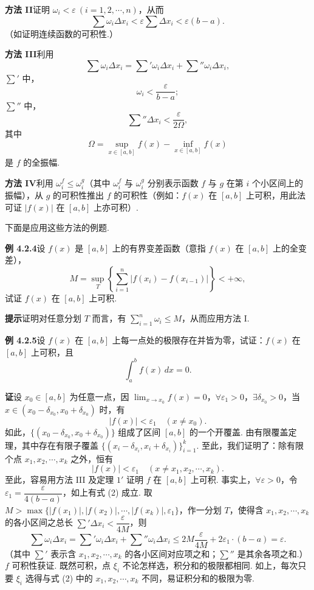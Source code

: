\documentclass[UTF8,12pt,a4paper,fontset=fandol]{ctexart}
\begin{document}
\noindent\textbf{方法 II}\quad 证明 $\omega_i<\varepsilon\ (i=1,2,\cdots,n)$，从而
\[
\sum\omega_i\Delta x_i<\varepsilon\sum\Delta x_i<\varepsilon(b-a).
\]
（如证明连续函数的可积性.）

\noindent\textbf{方法 III}\quad 利用
\[
\sum\omega_i\Delta x_i=\sum'\omega_i\Delta x_i+\sum''\omega_i\Delta x_i,
\]
$\sum'$ 中，
\[
\omega_i<\frac{\varepsilon}{b-a};
\]
$\sum''$ 中，
\[
\sum''\Delta x_i<\frac{\varepsilon}{2\Omega},
\]
其中
\[
\Omega=\sup_{x\in[a,b]}f(x)-\inf_{x\in[a,b]}f(x)
\]
是 $f$ 的全振幅.

\noindent\textbf{方法 IV}\quad 利用 $\omega_i^f\le\omega_i^g$（其中 $\omega_i^f$ 与 $\omega_i^g$ 分别表示函数 $f$ 与 $g$ 在第 $i$ 个小区间上的振幅），从 $g$ 的可积性推出 $f$ 的可积性（例如：$f(x)$ 在 $[a,b]$ 上可积，用此法可证
 $|f(x)|$ 在 $[a,b]$ 上亦可积）.

下面是应用这些方法的例题.

\noindent\textbf{例 4.2.4}\quad 设 $f(x)$ 是 $[a,b]$ 上的有界变差函数（意指 $f(x)$ 在 $[a,b]$ 上的全变差），
\[
M=\sup_T\left\{\sum_{i=1}^n|f(x_i)-f(x_{i-1})|\right\}<+\infty,
\]
试证 $f(x)$ 在 $[a,b]$ 上可积.

\noindent\textbf{提示}\quad 证明对任意分划 $T$ 而言，有 $\sum_{i=1}^n\omega_i\le M$，从而应用方法 I.

\noindent\textbf{例 4.2.5}\quad 设 $f(x)$ 在 $[a,b]$ 上每一点处的极限存在并皆为零，试证：$f(x)$ 在 $[a,b]$ 上可积，且
\[
\int_a^b f(x)\,dx=0.
\]

\noindent\textbf{证}\quad 设 $x_0\in[a,b]$ 为任意一点，因 $\lim_{x\to x_0}f(x)=0$，$\forall\varepsilon_1>0$，$\exists\delta_{x_0}>0$，当 $x\in(x_0-\delta_{x_0},x_0+\delta_{x_0})$ 时，有
\[
|f(x)|<\varepsilon_1\quad(x\ne x_0).
\tag{1}
\]
如此，$\{(x_0-\delta_{x_0},x_0+\delta_{x_0})\}$ 组成了区间 $[a,b]$ 的一个开覆盖. 由有限覆盖定理，其中存在有限子覆盖 $\{(x_i-\delta_{x_i},x_i+\delta_{x_i})\}_{i=1}^k$. 至此，我们证明了：除有限个点 $x_1,x_2,\cdots,x_k$ 之外，恒有
\[
|f(x)|<\varepsilon_1\quad(x\ne x_1,x_2,\cdots,x_k).
\tag{2}
\]
至此，容易用方法 III 及定理 $1'$ 证明 $f$ 在 $[a,b]$ 上可积. 事实上，$\forall\varepsilon>0$，令 $\varepsilon_1=\dfrac{\varepsilon}{4(b-a)}$，如上有式 (2) 成立. 取 $M>\max\{|f(x_1)|,|f(x_2)|,\cdots,|f(x_k)|,\varepsilon_1\}$，作一分划 $T$，使得含 $x_1,x_2,\cdots,x_k$ 的各小区间之总长 $\sum'\Delta x_i<\dfrac{\varepsilon}{4M}$，则
\[
\sum\omega_i\Delta x_i
=\sum'\omega_i\Delta x_i+\sum''\omega_i\Delta x_i
\le 2M\frac{\varepsilon}{4M}+2\varepsilon_1\cdot(b-a)=\varepsilon.
\]
（其中 $\sum'$ 表示含 $x_1,x_2,\cdots,x_k$ 的各小区间对应项之和；$\sum''$ 是其余各项之和.）$f$ 可积性获证. 既然可积，点 $\xi_i$ 不论怎样选，积分和的极限都相同. 如上，每次只要 $\xi_i$ 选得与式 (2) 中的 $x_1,x_2,\cdots,x_k$ 不同，易证积分和的极限为零.
\end{document}
